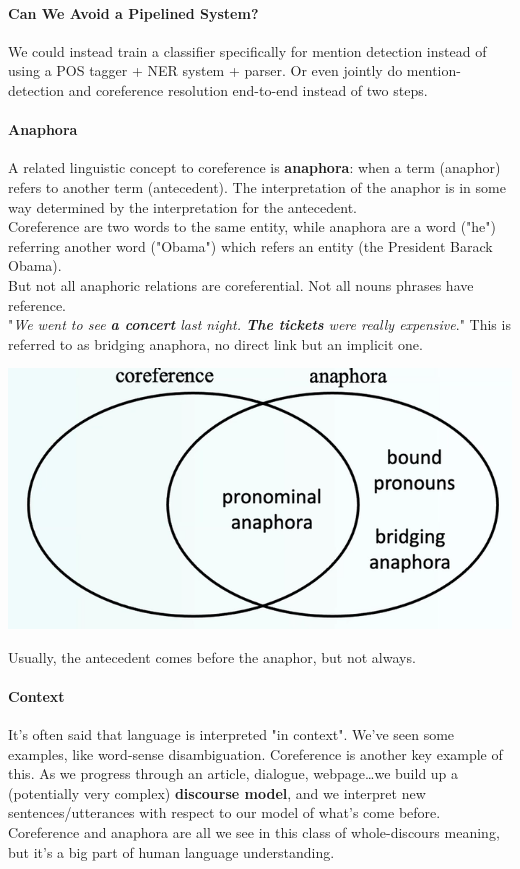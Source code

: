 \documentclass[10pt]{report}
\begin{document}
\paragraph{Can We Avoid a Pipelined System?} We could instead train a classifier specifically for mention detection instead of using a POS tagger + NER system + parser. Or even jointly do mention-detection and coreference resolution end-to-end instead of two steps.
\paragraph{Anaphora} A related linguistic concept to coreference is \textbf{anaphora}: when a term (anaphor) refers to another term (antecedent). The interpretation of the anaphor is in some way determined by the interpretation for the antecedent.\\
Coreference are two words to the same entity, while anaphora are a word ("he") referring another word ("Obama") which refers an entity (the President Barack Obama).\\
But not all anaphoric relations are coreferential. Not all nouns phrases have reference.\\
"\textit{We went to see \textbf{a concert} last night. \textbf{The tickets} were really expensive}." This is referred to as bridging anaphora, no direct link but an implicit one.
\begin{center}
	\includegraphics[scale=0.5]{102.png}
\end{center}
Usually, the antecedent comes before the anaphor, but not always.
\paragraph{Context} It's often said that language is interpreted "in context". We've seen some examples, like word-sense disambiguation. Coreference is another key example of this. As we progress through an article, dialogue, webpage\ldots we build up a (potentially very complex) \textbf{discourse model}, and we interpret new sentences/utterances with respect to our model of what's come before. Coreference and anaphora are all we see in this class of whole-discours meaning, but it's a big part of human language understanding.
\end{document}
